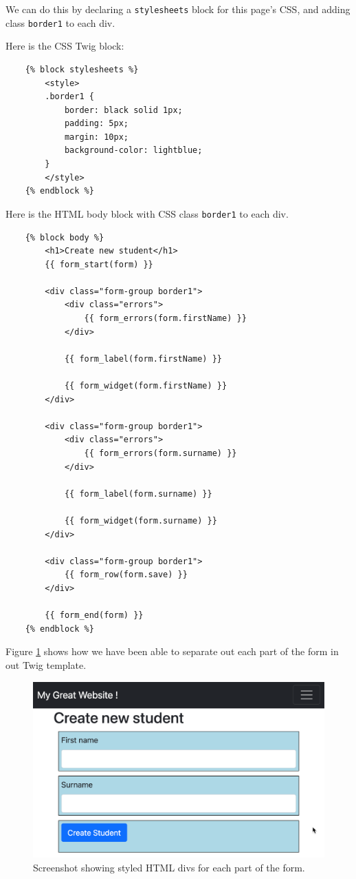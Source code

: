 \documentclass[a4paperpaper,openright]{book}
\begin{document}
We can do this by declaring a \texttt{stylesheets} block for this page's
CSS, and adding class \texttt{border1} to each div.

Here is the CSS Twig block:

\begin{verbatim}
    {% block stylesheets %}
        <style>
        .border1 {
            border: black solid 1px;
            padding: 5px;
            margin: 10px;
            background-color: lightblue;
        }
        </style>
    {% endblock %}
\end{verbatim}

Here is the HTML body block with CSS class \texttt{border1} to each div.

\begin{verbatim}
    {% block body %}
        <h1>Create new student</h1>
        {{ form_start(form) }}

        <div class="form-group border1">
            <div class="errors">
                {{ form_errors(form.firstName) }}
            </div>

            {{ form_label(form.firstName) }}

            {{ form_widget(form.firstName) }}
        </div>

        <div class="form-group border1">
            <div class="errors">
                {{ form_errors(form.surname) }}
            </div>

            {{ form_label(form.surname) }}

            {{ form_widget(form.surname) }}
        </div>

        <div class="form-group border1">
            {{ form_row(form.save) }}
        </div>

        {{ form_end(form) }}
    {% endblock %}
\end{verbatim}

Figure \ref{blue_borders} shows how we have been able to separate out
each part of the form in out Twig template.

\begin{figure}
\centering
\includegraphics{./tex2pdf.-8a1528da847c818a/26f9c90abbe2cd1033da950105dba6f8917ed10a.png}
\caption{Screenshot showing styled HTML divs for each part of the form.
\label{blue_borders}}
\end{figure}
\end{document}
